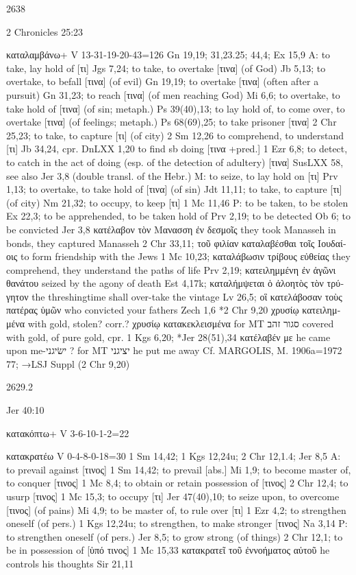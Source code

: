 \documentclass[11pt]{article}
\begin{document}
2638

2 Chronicles 25:23
\begin{greek}
καταλαμβάνω+ V 13-31-19-20-43=126
Gn 19,19; 31,23.25; 44,4; Ex 15,9
A: to take, lay hold of [τι] Jgs 7,24; to take, to overtake [τινα] (of God) Jb 5,13; to overtake, to befall
[τινα] (of evil) Gn 19,19; to overtake [τινα] (often after a pursuit) Gn 31,23; to reach [τινα] (of men
reaching God) Mi 6,6; to overtake, to take hold of [τινα] (of sin; metaph.) Ps 39(40),13; to lay hold of, to
come over, to overtake [τινα] (of feelings; metaph.) Ps 68(69),25; to take prisoner [τινα] 2 Chr 25,23; to
take, to capture [τι] (of city) 2 Sm 12,26
to comprehend, to understand [τι] Jb 34,24, cpr. DnLXX 1,20
to find sb doing [τινα +pred.] 1 Ezr 6,8; to detect, to catch in the act of doing (esp. of the detection of
adultery) [τινα] SusLXX 58, see also Jer 3,8 (double transl. of the Hebr.)
M: to seize, to lay hold on [τι] Prv 1,13; to overtake, to take hold of [τινα] (of sin) Jdt 11,11; to take, to
capture [τι] (of city) Nm 21,32; to occupy, to keep [τι] 1 Mc 11,46
P: to be taken, to be stolen Ex 22,3; to be apprehended, to be taken hold of Prv 2,19; to be detected Ob 6;
to be convicted Jer 3,8
κατέλαβον τὸν Μανασση ἐν δεσμοῖς they took Manasseh in bonds, they captured Manasseh 2 Chr 33,11;
τοῦ φιλίαν καταλαβέσθαι τοῖς Ιουδαίοις to form friendship with the Jews 1 Mc 10,23; καταλάβωσιν
τρίβους εὐθείας they comprehend, they understand the paths of life Prv 2,19; κατειλημμένη ἐν ἀγῶνι
θανάτου seized by the agony of death Est 4,17k; καταλήμψεται ὁ ἀλοητὸς τὸν τρύγητον the
threshingtime shall over-take the vintage Lv 26,5; οἳ κατελάβοσαν τοὺς πατέρας ὑμῶν who convicted
your fathers Zech 1,6 
*2 Chr 9,20 χρυσίῳ κατειλημμένα with gold, stolen? corr.? χρυσίῳ κατακεκλεισμένα for MT סגור זהב
covered with gold, of pure gold, cpr. 1 Kgs 6,20; *Jer 28(51),34 κατέλαβέν με he came upon me-ישׂיגני ?
for MT יציגני he put me away
Cf. MARGOLIS, M. 1906a=1972 77; →LSJ Suppl (2 Chr 9,20) 
\end{greek}

2629.2

Jer 40:10
\begin{greek}
κατακόπτω+ V 3-6-10-1-2=22

κατακρατέω V 0-4-8-0-18=30
1 Sm 14,42; 1 Kgs 12,24u; 2 Chr 12,1.4; Jer 8,5
A: to prevail against [τινος] 1 Sm 14,42; to prevail [abs.] Mi 1,9; to become master of, to conquer
[τινος] 1 Mc 8,4; to obtain or retain possession of [τινος] 2 Chr 12,4; to usurp [τινος] 1 Mc 15,3; to
occupy [τι] Jer 47(40),10; to seize upon, to overcome [τινος] (of pains) Mi 4,9; to be master of, to rule
over [τι] 1 Ezr 4,2; to strengthen oneself (of pers.) 1 Kgs 12,24u; to strengthen, to make stronger [τινος]
Na 3,14
P: to strengthen oneself (of pers.) Jer 8,5; to grow strong (of things) 2 Chr 12,1; to be in possession of
[ὑπό τινος] 1 Mc 15,33
κατακρατεῖ τοῦ ἐννοήματος αὐτοῦ he controls his thoughts Sir 21,11 
\end{greek}
\end{document}
